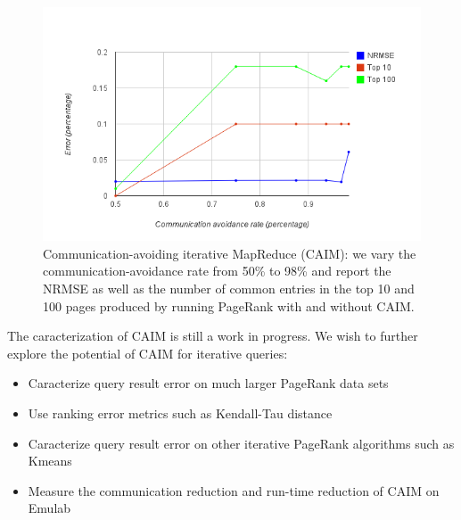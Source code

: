 \begin{figure}[!ht]
\centering\includegraphics[width=\columnwidth]{figs/comm_avoid_PR.png}
\vspace{-1.8em}
\caption{Communication-avoiding iterative MapReduce (CAIM): we vary the communication-avoidance rate from 50\% to 98\% and report the NRMSE as well as the number of common entries in the top 10 and 100 pages produced by running PageRank with and without CAIM.}
\label{fig:CAIM}
\vspace{.7em}
\end{figure}

The caracterization of CAIM is still a work in progress. We wish to further explore the potential of CAIM for iterative queries: 

\begin{itemize}

\item Caracterize query result error on much larger PageRank data sets
\item Use ranking error metrics such as Kendall-Tau distance
\item Caracterize query result error on other iterative PageRank algorithms such as Kmeans
\item Measure the communication reduction and run-time reduction of CAIM on Emulab

\end{itemize}
